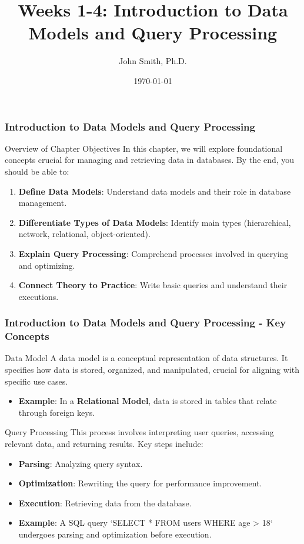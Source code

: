 \documentclass[aspectratio=169]{beamer}
\title[Introduction to Data Models]{Weeks 1-4: Introduction to Data Models and Query Processing}
\author[J. Smith]{John Smith, Ph.D.}
\institute[University Name]{
  Department of Computer Science\\
  University Name\\
  \vspace{0.3cm}
  Email: email@university.edu\\
  Website: www.university.edu
}
\date{\today}
\begin{document}
\frame{\titlepage}

\begin{frame}[fragile]
    \frametitle{Introduction to Data Models and Query Processing}
    \begin{block}{Overview of Chapter Objectives}
        In this chapter, we will explore foundational concepts crucial for managing and retrieving data in databases. By the end, you should be able to:
        \begin{enumerate}
            \item \textbf{Define Data Models}: Understand data models and their role in database management.
            \item \textbf{Differentiate Types of Data Models}: Identify main types (hierarchical, network, relational, object-oriented).
            \item \textbf{Explain Query Processing}: Comprehend processes involved in querying and optimizing.
            \item \textbf{Connect Theory to Practice}: Write basic queries and understand their executions.
        \end{enumerate}
    \end{block}
\end{frame}

\begin{frame}[fragile]
    \frametitle{Introduction to Data Models and Query Processing - Key Concepts}
    \begin{block}{Data Model}
        A data model is a conceptual representation of data structures. It specifies how data is stored, organized, and manipulated, crucial for aligning with specific use cases.
        \begin{itemize}
            \item \textbf{Example}: In a \textbf{Relational Model}, data is stored in tables that relate through foreign keys.
        \end{itemize}
    \end{block}

    \begin{block}{Query Processing}
        This process involves interpreting user queries, accessing relevant data, and returning results. Key steps include:
        \begin{itemize}
            \item \textbf{Parsing}: Analyzing query syntax.
            \item \textbf{Optimization}: Rewriting the query for performance improvement.
            \item \textbf{Execution}: Retrieving data from the database.
        \end{itemize}
        \begin{itemize}
            \item \textbf{Example}: A SQL query `SELECT * FROM users WHERE age > 18` undergoes parsing and optimization before execution.
        \end{itemize}
    \end{block}
\end{frame}
\end{document}

